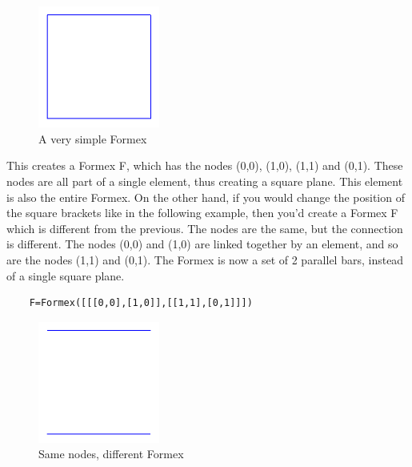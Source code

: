 \begin{figure}[ht]
  \centering
  \begin{makeimage}
  \end{makeimage}
  \begin{latexonly}
    \includegraphics[width=4cm]{images/square}
  \end{latexonly}
  \begin{htmlonly}
  \end{htmlonly}  
  \caption{A very simple Formex}
  \label{fig:square}
\end{figure}

This creates a Formex F, which has the nodes (0,0), (1,0), (1,1) and (0,1). These nodes are all part of a single element, thus creating a square plane. This element is also the entire Formex.
On the other hand, if you would change the position of the square brackets like in the following example, then you'd create a Formex F which is different from the previous. The nodes are the same, but the connection is different. The nodes (0,0) and (1,0) are linked together by an element, and so are the nodes (1,1) and (0,1). The Formex is now a set of 2 parallel bars, instead of a single square plane. 
\begin{verbatim}
	F=Formex([[[0,0],[1,0]],[[1,1],[0,1]]])
\end{verbatim}

\begin{figure}[ht]
  \centering
  \begin{makeimage}
  \end{makeimage}
  \begin{latexonly}
    \includegraphics[width=4cm]{images/parallel}
  \end{latexonly}
  \begin{htmlonly}
  \end{htmlonly}  
  \caption{Same nodes, different Formex}
\end{figure}

